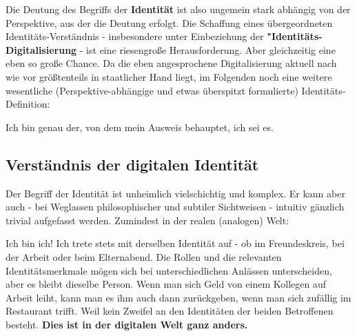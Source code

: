 \vspace{0.3cm}


\vspace{0.3cm}

Die Deutung des Begriffs der \textbf{Identität} ist also ungemein stark abhängig von der Perspektive, aus der die Deutung erfolgt. Die Schaffung eines übergeordneten Identitäts-Verständnis - insbesondere unter Einbeziehung der \textbf{"Identitäts-Digitalisierung} - ist eine riesengroße Herausforderung. Aber gleichzeitig eine eben so große Chance. Da die eben angesprochene Digitalisierung aktuell nach wie vor größtenteils in staatlicher Hand liegt, im Folgenden noch eine weitere wesentliche (Perspektive-abhängige und etwas überspitzt formulierte) Identitäts-Definition: 

\vspace{0.3cm}

\begin{Business-Def}\label{defStaatIdentity}

Ich bin genau der, von dem mein Ausweis behauptet, ich sei es.

\end{Business-Def}

\vspace{0.5cm}

\subsection{Verständnis der digitalen Identität}
\label{sec:einleitung_digitale_identitaet}

Der Begriff der Identität ist unheimlich vielschichtig und komplex. Er kann aber auch - bei Weglassen philosophischer und subtiler Sichtweisen - intuitiv gänzlich trivial aufgefasst werden. Zumindest in der realen (analogen) Welt:

Ich bin ich! Ich trete stets mit derselben Identität auf - ob im Freundeskreis, bei der Arbeit oder beim Elternabend. Die Rollen und die relevanten Identitätsmerkmale mögen sich bei unterschiedlichen Anlässen unterscheiden, aber es bleibt dieselbe Person. Wenn man sich Geld von einem Kollegen auf Arbeit leiht, kann man es ihm auch dann zurückgeben, wenn man sich zufällig im Restaurant trifft. Weil kein Zweifel an den Identitäten der beiden Betroffenen besteht. \textbf{Dies ist in der digitalen Welt ganz anders.}


